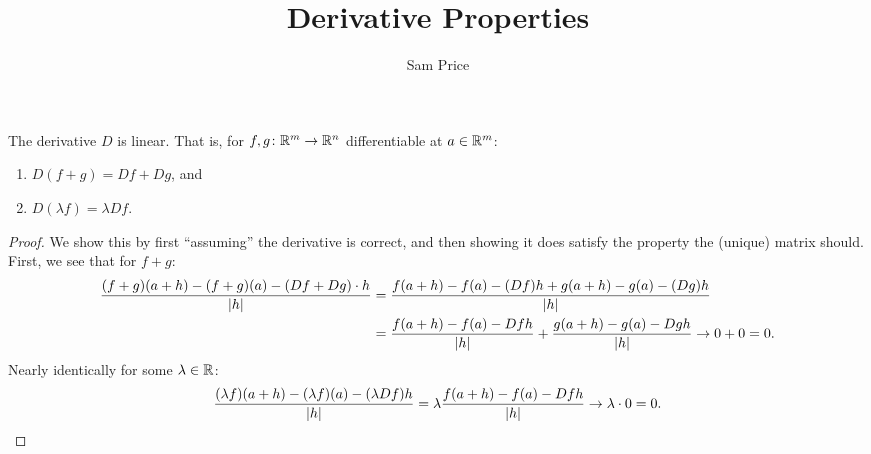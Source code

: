 \documentclass{article}
\author{Sam Price}
\title{Derivative Properties}
\begin{document}
\maketitle

\begin{proposition}{}{}
  The derivative $D$ is linear.
  That is, for $f, g \from \RR[m] \to \RR[n]$ differentiable at $a \in \RR[m]$:
  \begin{enumerate}[start=1,label={(\alph*)}]
    \item $D(f + g) = Df + Dg$, and
    \item $D(\lambda f) = \lambda Df$.
  \end{enumerate}
\end{proposition}
\begin{proof}
  We show this by first ``assuming'' the derivative is correct, and then showing it does satisfy the property the (unique) matrix should.
  First, we see that for $f + g$:
  \begin{align*}
    \frac{(f + g)(a + h) - (f + g)(a) - (Df + Dg) \cdot h}{\abs{h}} &= \frac{f(a + h) - f(a) - (Df)h + g(a + h) - g(a) - (Dg)h}{\abs{h}}\\
    &= \frac{f(a + h) - f(a) - Df h}{\abs{h}} + \frac{g(a + h) - g(a) - Dg h}{\abs{h}} \to 0 + 0 = 0.
  \end{align*}
  Nearly identically for some $\lambda \in \RR$:
  \[
    \frac{(\lambda f)(a + h) - (\lambda f)(a) - (\lambda Df)h}{\abs{h}} = \lambda\frac{f(a + h) - f(a) - Df h}{\abs{h}} \to \lambda \cdot 0 = 0.
  \]
\end{proof}
\end{document}
